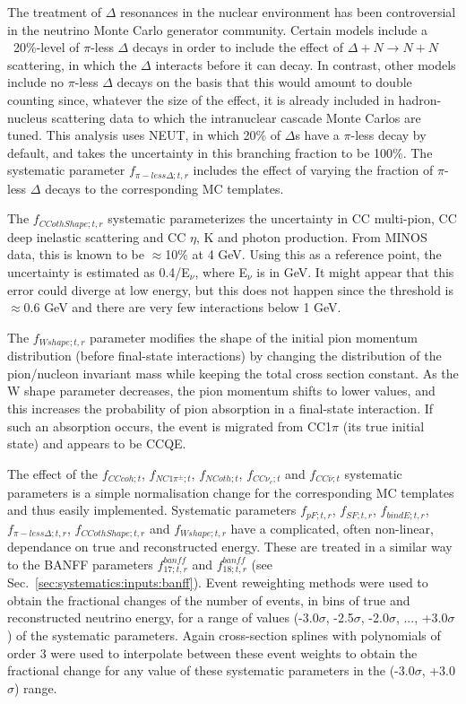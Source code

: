 The treatment of $\Delta$ resonances in the nuclear environment has been controversial in the neutrino
Monte Carlo generator community. Certain models include a ~20\%-level of $\pi$-less $\Delta$ decays in order
to include the effect of $\Delta+N \rightarrow N+N$ scattering, in which the $\Delta$ interacts before it can decay. 
In contrast, other models include no $\pi$-less 
$\Delta$ decays on the basis that this would amount to double counting since, whatever the size of the effect, 
it is already included in hadron-nucleus scattering data to which the intranuclear cascade Monte Carlos are tuned.
This analysis uses NEUT, in which 20\% of $\Delta$s have a $\pi$-less decay by default, and takes the uncertainty in this 
branching fraction to be 100\%. 
The systematic parameter $f_{\pi-less\Delta; t, r}$ includes the effect of varying the fraction of $\pi$-less $\Delta$ 
decays to the corresponding MC templates.

The $f_{CCothShape;t,r}$ systematic parameterizes the uncertainty in CC multi-pion, CC deep inelastic scattering and CC $\eta$, 
K and photon production. From MINOS data, this is known to be $\approx$10\% at 4 GeV. Using this as a reference point, 
the uncertainty is estimated as 0.4/E$_{\nu}$, where E$_{\nu}$ is in GeV. It might appear that this error could diverge at 
low energy, but this does not happen since the threshold is $\approx$0.6 GeV and there are very 
few interactions below 1 GeV. 

The $f_{Wshape;t,r}$ parameter modifies the shape of the initial pion momentum distribution (before final-state interactions) 
by changing the distribution of the pion/nucleon invariant mass while keeping the total cross section constant. As the 
W shape parameter decreases, the pion momentum shifts to lower values, and this increases the probability of pion 
absorption in a final-state interaction. If such an absorption occurs, the event is migrated from CC1$\pi$ (its 
true initial state) and appears to be CCQE.

The effect of the $f_{CCcoh; t}$, $f_{NC1\pi^\pm; t}$, $f_{NCoth; t}$, $f_{CC\nu_e; t}$ and $f_{CC\bar{\nu}; t}$ 
systematic parameters is a simple normalisation change for the corresponding MC templates and thus easily implemented.
Systematic parameters $f_{pF; t, r}$, $f_{SF; t, r}$, $f_{bindE; t, r}$, $f_{\pi-less\Delta; t, r}$, $f_{CCothShape; t, r}$ 
and $f_{Wshape; t, r}$  have a complicated, often non-linear, dependance on true and reconstructed energy.
These are treated in a similar way to the BANFF parameters $f_{17; t, r}^{banff}$ and $f_{18; t, r}^{banff}$ (see Sec.\ 
\ref{sec:systematics:inputs:banff}).
Event reweighting methods were used to obtain the fractional changes of the number of events, 
in bins of true and reconstructed neutrino energy, for a range of values (-3.0$\sigma$, -2.5$\sigma$, -2.0$\sigma$, ..., +3.0$\sigma$)
of the systematic parameters. Again cross-section splines with polynomials of order 3 were used to interpolate between these event 
weights to obtain the fractional change for any
value of these systematic parameters in the (-3.0$\sigma$, +3.0$\sigma$) range.

